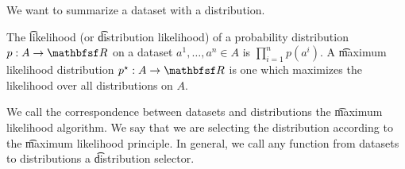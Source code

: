 
We want to summarize a dataset with a distribution.


The \t{likelihood} (or \t{distribution likelihood}) of a probability distribution $p: A \to \R $ on a dataset $a^1, \dots , a^n \in A$ is $\prod_{i = 1}^{n} p(a^i)$.
A \t{maximum likelihood distribution} $p^\star: A \to \R $ is one which maximizes the likelihood over all distributions on $A$.

We call the correspondence between datasets and distributions the \t{maximum likelihood algorithm}.
We say that we are selecting the distribution according to the \t{maximum likelihood principle}.
In general, we call any function from datasets to distributions a \t{distribution selector}.

\blankpage
